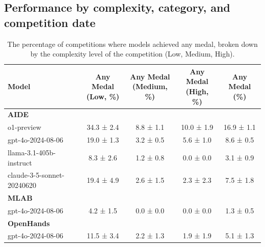 \documentclass{article} %
\begin{document}
\begin{tcolorbox}[colback=lightgray!10, colframe=black, width=\textwidth, arc=2mm, boxrule=0.5mm, title=The obfuscated description for champs-scalar-coupling, breakable]
\begin{lstlisting}[basicstyle=\tiny\ttfamily, breaklines=true]
    \end{lstlisting}
\end{tcolorbox}
\label{fig:obfuscated_description.md}

\subsection{Performance by complexity, category, and competition date}\label{app:performance-by-complexity-and-category}

\begin{table}[h]
\centering
{
\renewcommand{\arraystretch}{0.9}
\begin{tabular}{l >{\columncolor[HTML]{D1FAE5}}c >{\columncolor[HTML]{FFEDD5}}c >{\columncolor[HTML]{FEE2E2}}c c}
\toprule
\textbf{Model} & \shortstack{\textbf{Any Medal} \\ \textbf{(Low, \%)}} & \shortstack{\textbf{Any Medal} \\ \textbf{(Medium, \%)}} & \shortstack{\textbf{Any Medal} \\ \textbf{(High, \%)}} & \shortstack{\textbf{Any Medal} \\ \textbf{(\%)}} \\
\midrule
\multicolumn{5}{l}{\textbf{AIDE}} \\
\midrule
o1-preview & 34.3 ± 2.4 & 8.8 ± 1.1 & 10.0 ± 1.9 & 16.9 ± 1.1 \\
gpt-4o-2024-08-06 & 19.0 ± 1.3 & 3.2 ± 0.5 & 5.6 ± 1.0 & 8.6 ± 0.5 \\
llama-3.1-405b-instruct & 8.3 ± 2.6 & 1.2 ± 0.8 & 0.0 ± 0.0 & 3.1 ± 0.9 \\
claude-3-5-sonnet-20240620 & 19.4 ± 4.9 & 2.6 ± 1.5 & 2.3 ± 2.3 & 7.5 ± 1.8 \\
\midrule
\multicolumn{5}{l}{\textbf{MLAB}} \\
\midrule
gpt-4o-2024-08-06 & 4.2 ± 1.5 & 0.0 ± 0.0 & 0.0 ± 0.0 & 1.3 ± 0.5 \\
\midrule
\multicolumn{5}{l}{\textbf{OpenHands}} \\
\midrule
gpt-4o-2024-08-06 & 11.5 ± 3.4 & 2.2 ± 1.3 & 1.9 ± 1.9 & 5.1 ± 1.3 \\
\bottomrule
\end{tabular}
}
\caption{The percentage of competitions where models achieved any medal, broken down by the complexity level of the competition (Low, Medium, High).}
\label{tab:performance-by-complexity}
\end{table}
\end{document}
